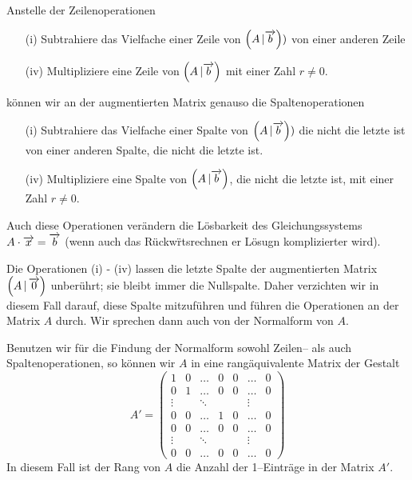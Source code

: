 \begin{notiz}\label{rg_equ_operation_trans} 
Anstelle der Zeilenoperationen

\begin{itemize}
\item[(i)] Subtrahiere das Vielfache einer Zeile von $\left(A \, \vert \overrightarrow{b}\right))$ 
von einer anderen Zeile 
\item[(iv)] Multipliziere eine Zeile von $\left(A \, \vert \overrightarrow{b}\right)$ mit einer Zahl 
$r \neq 0$.
\end{itemize}

können wir an der augmentierten Matrix genauso die Spaltenoperationen
\begin{itemize}
\item[(i)] Subtrahiere das Vielfache einer Spalte von $\left(A \, \vert \overrightarrow{b}\right))$ 
die nicht die letzte ist von einer anderen Spalte, die nicht die letzte ist. 
\item[(iv)] Multipliziere eine Spalte von $\left(A \, \vert \overrightarrow{b}\right)$, die nicht die 
letzte ist, mit einer Zahl $r \neq 0$.
\end{itemize}
Auch diese Operationen verändern die Lösbarkeit des Gleichungssystems $A \cdot \overrightarrow{x} = 
\overrightarrow{b}$ (wenn auch das Rückw\"rtsrechnen er Lösugn komplizierter wird). 
\end{notiz}

\medbreak

\begin{notiz}\label{gls_rang_normalform} 
Die Operationen (i) - (iv) lassen die letzte Spalte der augmentierten 
Matrix $\left(A \, \vert \, \overrightarrow{0}\right)$ unberührt; sie bleibt immer 
die Nullspalte. Daher verzichten wir in diesem Fall darauf, diese Spalte mitzuführen 
und führen die Operationen an der Matrix $A$ durch. Wir sprechen dann auch von der 
Normalform von $A$.

Benutzen  wir für die Findung der Normalform sowohl Zeilen-- als auch Spaltenoperationen, so 
können wir $A$ in eine rangäquivalente Matrix der Gestalt
  	$$ A' = \left( \begin{matrix} 1 & 0 &   \ldots & 0 & 0 & \ldots & 0 \\
	0 & 1 &   \ldots & 0 & 0 & \ldots & 0 \\
	\vdots & & \ddots & & &  \vdots \\
	0 & 0 &   \ldots & 1 & 0 & \ldots & 0 \\
	0 & 0 &   \ldots & 0 & 0 & \ldots & 0 \\
	\vdots & & \ddots & & &  \vdots \\
 	0 & 0 &   \ldots & 0 & 0 & \ldots & 0
  	\end{matrix} \right) $$
In diesem Fall ist der Rang von $A$ die Anzahl der 1--Einträge in der Matrix $A'$.
\end{notiz}

